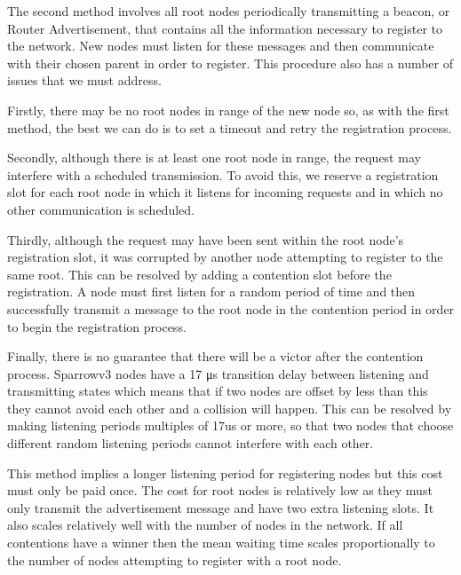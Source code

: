 The second method involves all root nodes periodically transmitting a beacon,
or Router Advertisement, that contains all the information necessary to
register to the network. New nodes must listen for these messages and then
communicate with their chosen parent in order to register. This procedure also
has a number of issues that we must address.

Firstly, there may be no root nodes in range of the new node so, as with the
first method, the best we can do is to set a timeout and retry the registration
process.

Secondly, although there is at least one root node in range, the request may
interfere with a scheduled transmission. To avoid this, we reserve a
registration slot for each root node in which it listens for incoming requests
and in which no other communication is scheduled.

Thirdly, although the request may have been sent within the root
node's registration slot, it was corrupted by another node attempting to
register to the same root. This can be resolved by adding a contention slot
before the registration. A node must first listen for a random period of time
and then successfully transmit a message to the root node in the contention
period in order to begin the registration process.

Finally, there is no
guarantee that there will be a victor after the contention process. Sparrowv3
nodes have a 17 μs transition delay between listening and transmitting states
which means that if two nodes are offset by less than this they cannot avoid
each other and a collision will happen. This can be resolved by making
listening periods multiples of 17us or more, so that two nodes that choose 
different random listening periods cannot interfere with each other.

This method implies a longer listening period for registering nodes but this
cost must only be paid once. The cost for root nodes is relatively low as they
must only transmit the advertisement message and have two extra listening
slots. It also scales relatively well with the number of nodes in the network.
If all contentions have a winner then the mean waiting time scales
proportionally to the number of nodes attempting to register with a root node. 

\vspace{\baselineskip}

